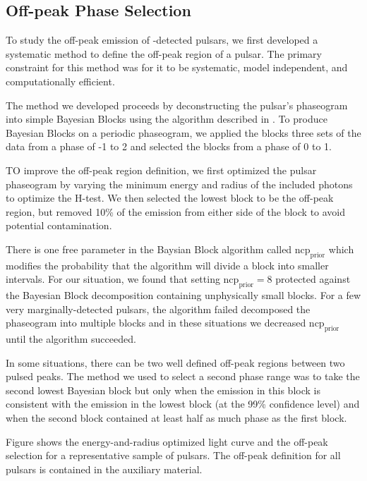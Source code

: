 \subsection{Off-peak Phase Selection}
\label{subsec:off_peak_defintion}

To study the off-peak emission of \lat-detected pulsars, we first
developed a systematic method to define the off-peak region of a pulsar.
The primary constraint for this method was for it to be systematic,
model independent, and computationally efficient.

The method we developed proceeds by deconstructing the pulsar's
phaseogram into simple Bayesian Blocks using the 
algorithm described in \cite{Jackson_Bayesian_Blocks_2003}.
To produce Bayesian Blocks on a periodic phaseogram, we applied the blocks
three sets of the data from a phase of -1 to 2 and selected the blocks from a
phase of 0 to 1.

TO improve the off-peak region definition,
we first optimized the pulsar phaseogram
by varying the minimum energy and radius of the included photons to optimize
the H-test. We then selected the lowest block to be the off-peak
region, but removed 10\% of the emission from either side of the block
to avoid potential contamination.

There is one free parameter in the Baysian Block algorithm called
$\text{ncp}_\text{prior}$ which modifies the probability that the
algorithm will divide a block into smaller intervals. For our situation,
we found that setting $\text{ncp}_\text{prior}=8$ protected against
the Bayesian Block decomposition containing unphysically small blocks.
For a few very marginally-detected pulsars, the algorithm failed
decomposed the phaseogram into multiple blocks
and in these situations we decreased $\text{ncp}_\text{prior}$ until the
algorithm succeeded.

In some situations, there can be two well defined off-peak regions between two
pulsed peaks. The method we used to select a second phase range was
to take the second lowest Bayesian block
but only when the emission in this block is consistent with the emission in
the lowest block (at the 99\% confidence level) and when the
second block contained at least half as much phase as the first block.

Figure  shows the energy-and-radius optimized
light curve and the off-peak selection for a representative sample of pulsars.
The off-peak definition for all pulsars is contained in the auxiliary material.

